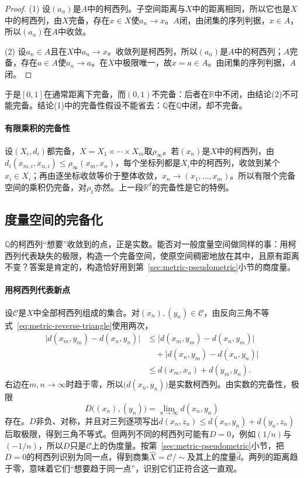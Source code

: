 \begin{proof}
(1) 设$(a_n)$是$A$中的柯西列。子空间距离与$X$中的距离相同，所以它也是$X$中的柯西列，由$X$完备，存在$x\in X$使$a_n\to x$。$A$闭，由闭集的序列判据，$x\in A$，所以$(a_n)$在$A$中收敛。

(2) 设$a_n\in A$且在$X$中$a_n\to x$。收敛列是柯西列，所以$(a_n)$是$A$中的柯西列；$A$完备，存在$a\in A$使$a_n\to a$。在$X$中极限唯一，故$x=a\in A$。由闭集的序列判据，$A$闭。
\end{proof}

于是$[0,1]$在通常距离下完备，而$(0,1)$不完备：后者在$\mathbb R$中不闭，由结论(2)不可能完备。结论(1)中的完备性假设不能省去：$\mathbb Q$在$\mathbb Q$中闭，却不完备。

\paragraph{有限乘积的完备性}
设$(X_i,d_i)$都完备，$X=X_1\times\cdots\times X_m$取$\rho_\infty$。若$(x_n)$是$X$中的柯西列，由$d_i(x_{m,i},x_{n,i})\leq\rho_\infty(x_m,x_n)$，每个坐标列都是$X_i$中的柯西列，收敛到某个$x_i\in X_i$；再由逐坐标收敛等价于整体收敛，$x_n\to(x_1,\dots,x_m)$。所以有限个完备空间的乘积仍完备，对$\rho_1$亦然。上一段$\mathbb R^d$的完备性是它的特例。

\subsection{度量空间的完备化}
\label{sec:metric-completion}

$\mathbb Q$的柯西列“想要”收敛到的点，正是实数。能否对一般度量空间做同样的事：用柯西列代表缺失的极限，构造一个完备空间，使原空间稠密地放在其中，且原有距离不变？答案是肯定的，构造恰好用到第~\ref{sec:metric-pseudometric}小节的商度量。

\paragraph{用柯西列代表新点}
设$\mathcal C$是$X$中全部柯西列组成的集合。对$(x_n),(y_n)\in\mathcal C$，由反向三角不等式~\eqref{eq:metric-reverse-triangle}使用两次，
\[
  \begin{aligned}
    \bigl|d(x_m,y_m)-d(x_n,y_n)\bigr|
    &\leq\bigl|d(x_m,y_m)-d(x_n,y_m)\bigr|\\
    &\quad+\bigl|d(x_n,y_m)-d(x_n,y_n)\bigr|\\
    &\leq d(x_m,x_n)+d(y_m,y_n).
  \end{aligned}
\]
右边在$m,n\to\infty$时趋于零，所以$\bigl(d(x_n,y_n)\bigr)$是实数柯西列。由实数的完备性，极限
\[
  D\bigl((x_n),(y_n)\bigr)=\lim_{n\to\infty}d(x_n,y_n)
\]
存在。$D$非负、对称，并且对三列逐项写出$d(x_n,z_n)\leq d(x_n,y_n)+d(y_n,z_n)$后取极限，得到三角不等式。但两列不同的柯西列可能有$D=0$，例如$(1/n)$与$(-1/n)$，所以$D$只是$\mathcal C$上的伪度量。按第~\ref{sec:metric-pseudometric}小节，把$D=0$的柯西列识别为同一点，得到商集$\widehat X=\mathcal C/{\sim}$及其上的度量$\hat d$。两列的距离趋于零，意味着它们“想要趋于同一点”，识别它们正符合这一直观。

